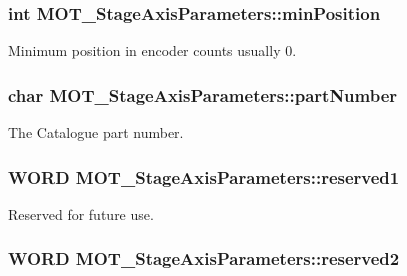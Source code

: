 \subsubsection[{\texorpdfstring{min\+Position}{minPosition}}]{\setlength{\rightskip}{0pt plus 5cm}int M\+O\+T\+\_\+\+Stage\+Axis\+Parameters\+::min\+Position}\hypertarget{struct_m_o_t___stage_axis_parameters_abf285b2f9d0834dc5508237b960ebba2}{}\label{struct_m_o_t___stage_axis_parameters_abf285b2f9d0834dc5508237b960ebba2}


Minimum position in encoder counts usually 0. 

\subsubsection[{\texorpdfstring{part\+Number}{partNumber}}]{\setlength{\rightskip}{0pt plus 5cm}char M\+O\+T\+\_\+\+Stage\+Axis\+Parameters\+::part\+Number}\hypertarget{struct_m_o_t___stage_axis_parameters_af8179302cca68141340dc1cff1fd107c}{}\label{struct_m_o_t___stage_axis_parameters_af8179302cca68141340dc1cff1fd107c}


The Catalogue part number. 

\subsubsection[{\texorpdfstring{reserved1}{reserved1}}]{\setlength{\rightskip}{0pt plus 5cm}W\+O\+RD M\+O\+T\+\_\+\+Stage\+Axis\+Parameters\+::reserved1}\hypertarget{struct_m_o_t___stage_axis_parameters_ae32908f1de15dc6f705cb0c5ff80571b}{}\label{struct_m_o_t___stage_axis_parameters_ae32908f1de15dc6f705cb0c5ff80571b}


Reserved for future use. 

\subsubsection[{\texorpdfstring{reserved2}{reserved2}}]{\setlength{\rightskip}{0pt plus 5cm}W\+O\+RD M\+O\+T\+\_\+\+Stage\+Axis\+Parameters\+::reserved2}\hypertarget{struct_m_o_t___stage_axis_parameters_abb92e3a8c878f2d205c944cd1e738643}{}\label{struct_m_o_t___stage_axis_parameters_abb92e3a8c878f2d205c944cd1e738643}


